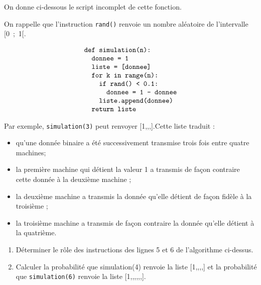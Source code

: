 On donne ci-dessous le script incomplet de cette fonction.

On rappelle que l'instruction \texttt{rand()} renvoie un nombre aléatoire de l'intervalle [0~;~1[.


\[
\begin{array}{l}
\texttt{def simulation(n):}\\
\texttt{\hspace{1em}donnee = 1}\\
\texttt{\hspace{1em}liste = [donnee]}\\
\texttt{\hspace{1em}for k in range(n):}\\
\texttt{\hspace{2em}if rand() < 0.1:}\\
\texttt{\hspace{3em}donnee = 1 - donnee}\\
\texttt{\hspace{2em}liste.append(donnee)}\\
\texttt{\hspace{1em}return liste}
\end{array}
\]

\medskip

Par exemple, \texttt{simulation(3)} peut renvoyer [1,,,].Cette liste traduit :

\begin{itemize}[label=$\bullet~$]
\item qu'une donnée binaire a été successivement transmise trois fois entre quatre machines;
\item la première machine qui détient la valeur 1 a transmis de façon contraire cette donnée à la deuxième machine ;
\item la deuxième machine a transmis la donnée qu'elle détient de façon fidèle à la troisième ;
\item la troisième machine a transmis de façon contraire la donnée qu'elle détient à la quatrième.
\end{itemize}

\medskip

\begin{enumerate}
\item Déterminer le rôle des instructions des lignes 5 et 6 de l'algorithme ci-dessus.
\item Calculer la probabilité que simulation(4) renvoie la liste [1,,,,] et la probabilité que \texttt{simulation(6)} renvoie la liste [1,,,,,,].
\end{enumerate}

\bigskip
